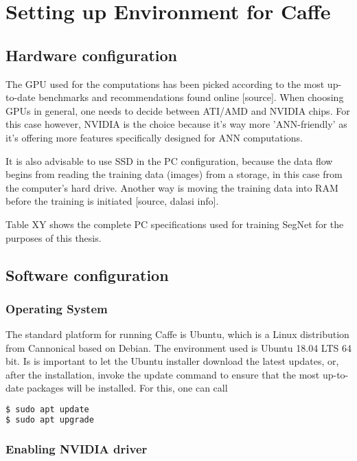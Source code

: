 \section{Setting up Environment for Caffe}

\subsection{Hardware configuration}

The GPU used for the computations has been picked according to the most up-to-date benchmarks and recommendations found online [source]. When choosing GPUs in general, one needs to decide between ATI/AMD and NVIDIA chips. For this case however, NVIDIA is the choice because it's way more 'ANN-friendly' as it's offering more features specifically designed for ANN computations. 

It is also advisable to use SSD in the PC configuration, because the data flow begins from reading the training data (images) from a storage, in this case from the computer's hard drive. Another way is moving the training data into RAM before the training is initiated [source, dalasi info]. 

Table XY shows the complete PC specifications used for training SegNet for the purposes of this thesis.  

\subsection{Software configuration} 

\subsubsection{Operating System} 

The standard platform for running Caffe is Ubuntu, which is a Linux distribution from Cannonical based on Debian. The environment used is Ubuntu 18.04 LTS 64 bit. Is is important to let the Ubuntu installer download the latest updates, or, after the installation, invoke the update command to ensure that the most up-to-date packages will be installed. For this, one can call

\begin{lstlisting}[language=bash]
$ sudo apt update
$ sudo apt upgrade
\end{lstlisting}

\subsubsection{Enabling NVIDIA driver}

